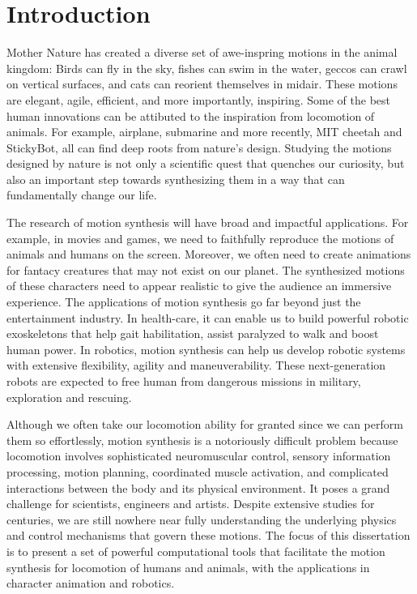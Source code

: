 \chapter{Introduction}

Mother Nature has created a diverse set of awe-inspring motions in the animal kingdom: Birds can fly in the sky, fishes can swim in the water, geccos can crawl on vertical surfaces, and cats can reorient themselves in midair. These motions are elegant, agile, efficient, and more importantly, inspiring. Some of the best human innovations can be attibuted to the inspiration from locomotion of animals. For example, airplane, submarine and more recently, MIT cheetah and StickyBot, all can find deep roots from nature's design. Studying the motions designed by nature is not only a scientific quest that quenches our curiosity, but also an important step towards synthesizing them in a way that can fundamentally change our life.

The research of motion synthesis will have broad and impactful applications. For example, in movies and games, we need to faithfully reproduce the motions of animals and humans on the screen. Moreover, we often need to create animations for fantacy creatures that may not exist on our planet. The synthesized motions of these characters need to appear realistic to give the audience an immersive experience. The applications of motion synthesis go far beyond just the entertainment industry. In health-care, it can enable us to build powerful robotic exoskeletons that help gait habilitation, assist paralyzed to walk and boost human power. In robotics, motion synthesis can help us develop robotic systems with extensive flexibility, agility and maneuverability. These next-generation robots are expected to free human from dangerous missions in military, exploration and rescuing. 

Although we often take our locomotion ability for granted since we can perform them so effortlessly, motion synthesis is a notoriously difficult problem because locomotion involves sophisticated neuromuscular control, sensory information processing, motion planning, coordinated muscle activation, and complicated interactions between the body and its physical environment. It poses a grand challenge for scientists, engineers and artists. Despite extensive studies for centuries, we are still nowhere near fully understanding the underlying physics and control mechanisms that govern these motions. The focus of this dissertation is to present a set of powerful computational tools that facilitate the motion synthesis for locomotion of humans and animals, with the applications in character animation and robotics.

